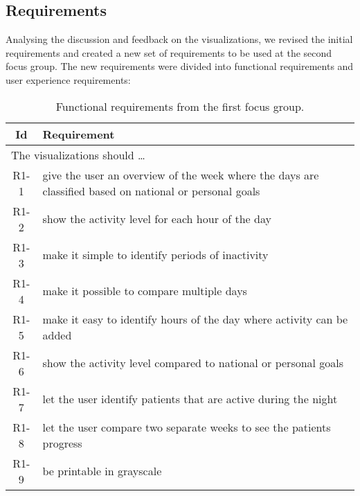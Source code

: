 \subsection{Requirements}
Analysing the discussion and feedback on the visualizations, we revised the initial requirements and created a new set of requirements to be used at the second focus group. The new requirements were divided into functional requirements and user experience requirements:

\begin{table}[h!]
  \begin{center}
  \begin{tabular}{|c|p{12cm}|}
    \hline
      \textbf{Id} & \textbf{Requirement} \\ \hline
    \multicolumn{2}{|l|}{The visualizations should \ldots} \\ \hline
      R1-1 & give the user an overview of the week where the days are classified based on national or personal goals \\ \hline
      R1-2 & show the activity level for each hour of the day \\ \hline
      R1-3 & make it simple to identify periods of inactivity \\ \hline
      R1-4 & make it possible to compare multiple days \\ \hline
      R1-5 & make it easy to identify hours of the day where activity can be added \\ \hline
      R1-6 & show the activity level compared to national or personal goals \\ \hline
      R1-7 & let the user identify patients that are active during the night \\ \hline
      R1-8 & let the user compare two separate weeks to see the patients progress \\ \hline
      R1-9 & be printable in grayscale \\ \hline
  \end{tabular}
  \end{center}
  \caption{Functional requirements from the first focus group.}
\end{table}

